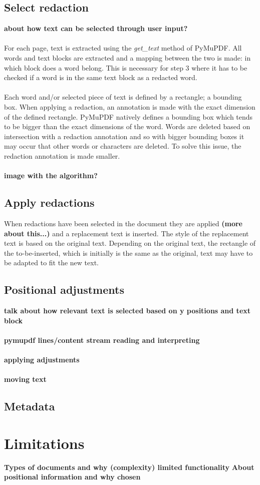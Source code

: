 \subsection{Select redaction}
\textbf{about how text can be selected through user input?}
\\\\
For each page, text is extracted using the \textit{get\_text} method of PyMuPDF. All words and text blocks are extracted and a mapping between the two is made: in which block does a word belong. This is necessary for step 3 where it has to be checked if a word is in the same text block as a redacted word. 
\\\\
Each word and/or selected piece of text is defined by a rectangle; a bounding box. When applying a redaction, an annotation is made with the exact dimension of the defined rectangle. PyMuPDF natively defines a bounding box which tends to be bigger than the exact dimensions of the word. Words are deleted based on intersection with a redaction annotation and so with bigger bounding boxes it may occur that other words or characters are deleted. To solve this issue, the redaction annotation is made smaller. 
\\\\
\textbf{image with the algorithm?}

\subsection{Apply redactions}
When redactions have been selected in the document they are applied \textbf{(more about this...)} and a replacement text is inserted. The style of the replacement text is based on the original text. Depending on the original text, the rectangle of the to-be-inserted, which is initially is the same as the original, text may have to be adapted to fit the new text. 
\subsection{Positional adjustments}
\textbf{talk about how relevant text is selected based on y positions and text block}
\\\\
\textbf{pymupdf lines/content stream reading and interpreting}
\\\\
\textbf{applying adjustments}
\\\\
\textbf{moving text}
\subsection{Metadata}

\section{Limitations}
\textbf{Types of documents and why (complexity) limited functionality}
\textbf{About positional information and why chosen}